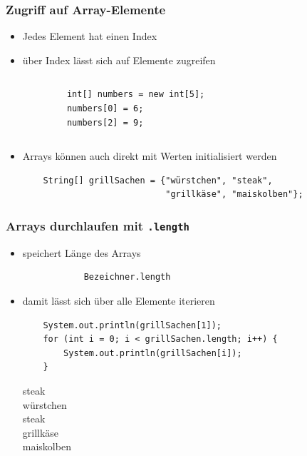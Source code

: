 \documentclass{../../presentation}
\begin{document}
\begin{frame}[fragile]
	\frametitle{Zugriff auf Array-Elemente}
	\begin{itemize}
		\item\pause Jedes Element hat einen Index
		\item\pause über Index lässt sich auf Elemente zugreifen
	\end{itemize}
	\begin{columns}
		\begin{verbatim}
            int[] numbers = new int[5];
            numbers[0] = 6;
            numbers[2] = 9;
        \end{verbatim}

		\begin{center}
		\end{center}
	\end{columns}

	\vspace{0.5cm}
	\begin{itemize}
		\item\pause Arrays können auch direkt mit Werten initialisiert werden
		      \begin{verbatim}
    String[] grillSachen = {"würstchen", "steak",
                            "grillkäse", "maiskolben"};
    \end{verbatim}
	\end{itemize}
\end{frame}

\begin{frame}[fragile]
	\frametitle{Arrays durchlaufen mit \texttt{.length}}
	\begin{itemize}
		\item\pause speichert Länge des Arrays
		      \begin{verbatim}
			Bezeichner.length
		\end{verbatim}
		\item\pause damit lässt sich über alle Elemente iterieren
		      \begin{verbatim}
    System.out.println(grillSachen[1]);
    for (int i = 0; i < grillSachen.length; i++) {
        System.out.println(grillSachen[i]);
    }
    \end{verbatim}
		      \begin{ausgabe}
			      steak \\
			      würstchen \\
			      steak \\
			      grillkäse \\
			      maiskolben
		      \end{ausgabe}
	\end{itemize}
\end{frame}

\renewcommand{\feedbackurl}{\vkFeedbackUrlDayThree}

\end{document}
